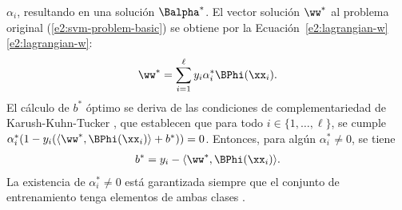 $\alpha_i$, resultando en una solución
$\Balpha^*$. El vector solución $\ww^*$ al problema original
(\ref{e2:svm-problem-basic}) se obtiene por la
 \iflatexml{}Ecuación~\ref{e2:lagrangian-w}\else\autoref{e2:lagrangian-w}\fi:
%
\begin{align}\label{e2:w-from-alpha}
  \ww^* = \sum_{i=1}^\ell y_i\alpha^*_i\BPhi(\xx_i).
\end{align}
%
El cálculo de $b^*$ óptimo se deriva de las condiciones de
complementariedad de Karush-Kuhn-Tucker \cite{kuhntucker,bottou}, que
establecen que para todo $i\in\{1,\ldots,\ell\}$, se cumple
$\alpha^*_i(1-y_i(\langle\ww^*,\BPhi(\xx_i)\rangle+b^*))=0$. Entonces,
para algún $\alpha^*_i\neq0$, se tiene
%
\begin{align}\label{e2:b-from-alpha}
  b^* = y_i - \langle\ww^*,\BPhi(\xx_i)\rangle .
\end{align}
%
La existencia de $\alpha^*_i\neq0$ está garantizada siempre que el
conjunto de entrenamiento tenga elementos de ambas clases
\cite{glasmachers}.
